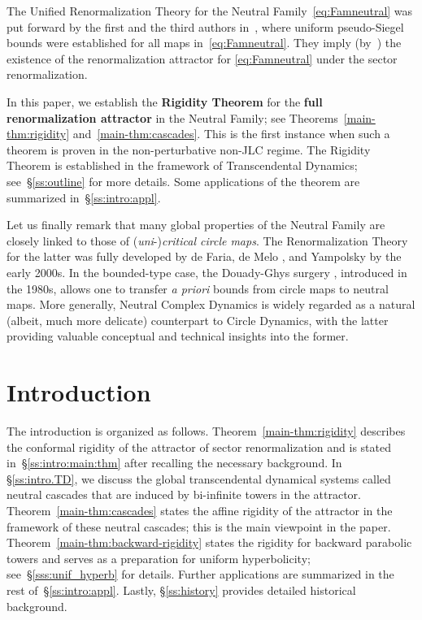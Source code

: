 \documentclass{amsart}
\begin{document}
The Unified Renormalization Theory for the Neutral Family~\eqref{eq:Famneutral} was put forward by the first and the third authors in~\cite{DLy22}, where uniform pseudo-Siegel bounds were established for all maps in~\eqref{eq:Famneutral}. They imply (by~\cite{DLy26a}) the existence of the renormalization attractor for \eqref{eq:Famneutral} under the sector renormalization.

In this paper, we establish the {\bf Rigidity Theorem} for the 
{\bf full renormalization attractor} in the Neutral Family;
see Theorems~\ref{main-thm:rigidity} and~\ref{main-thm:cascades}. This is the first instance when such a theorem is proven in the non-perturbative  non-JLC regime. 
The Rigidity Theorem is established 
in the framework of Transcendental Dynamics; see~\S\ref{ss:outline} for more details. 
Some applications of the theorem are summarized in~\S\ref{ss:intro:appl}.

Let us finally remark that many global properties of the Neutral Family  
are closely linked to those of (\emph{uni}-)\emph{critical circle maps}. The Renormalization Theory for the latter was fully developed by de Faria, de Melo \cite{dF99,dFdM00}, and Yampolsky \cite{Y01,Y03a,Y03b} by the early 2000s. 
In the bounded-type case, the Douady-Ghys surgery \cite{D87,G84}, introduced in the 1980s, allows one to transfer \emph{a priori} bounds from circle maps to neutral maps. More generally, Neutral Complex Dynamics is widely regarded as a natural 
(albeit, much more  delicate)   counterpart 
to Circle Dynamics, 
with the latter providing valuable  
conceptual and technical insights into the former.

\vspace{0.3cm}


\endgroup








\section{Introduction}
\label{sec:intro}

The introduction is organized as follows. Theorem~\ref{main-thm:rigidity} describes the conformal rigidity of the attractor of sector renormalization and is stated in~\S\ref{ss:intro:main:thm} after recalling the necessary background. In \S\ref{ss:intro.TD}, we discuss the global transcendental dynamical systems called neutral cascades that are induced by bi-infinite towers in the attractor. Theorem~\ref{main-thm:cascades} states the affine rigidity of the attractor in the framework of these neutral cascades; this is the main viewpoint in the paper. Theorem~\ref{main-thm:backward-rigidity} states the rigidity for backward parabolic towers and serves as a preparation for uniform hyperbolicity; see~\S\ref{sss:unif_hyperb} for details. Further applications are summarized in the rest of~\S\ref{ss:intro:appl}. Lastly, \S\ref{ss:history} provides detailed historical background.
\end{document}
